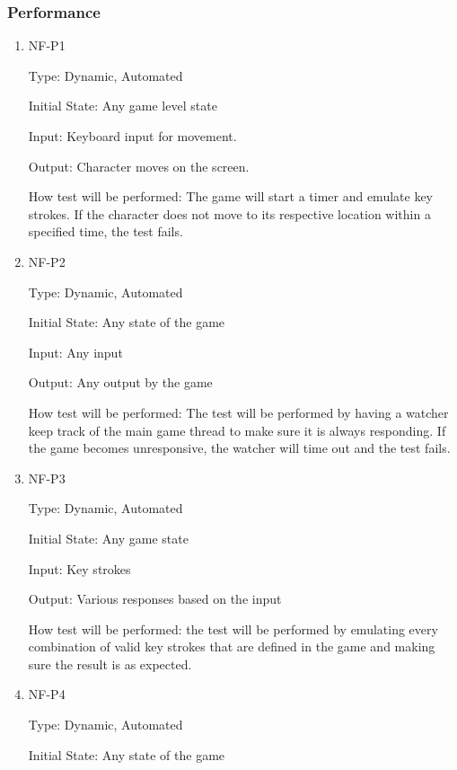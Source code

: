 \documentclass[12pt, titlepage]{article}
\begin{document}
\subsubsection{Performance}

\begin{enumerate}

\item{NF-P1\\}

Type:  Dynamic, Automated
					
Initial State: Any game level state
					
Input: Keyboard input for movement.
					
Output: Character moves on the screen.
					
How test will be performed: The game will start a timer and emulate key strokes. If the character does not move to its respective location within a specified time, the test fails.

\item{NF-P2\\}

Type: Dynamic, Automated
					
Initial State: Any state of the game
					
Input: Any input
					
Output: Any output by the game
					
How test will be performed: The test will be performed by having a watcher keep track of the main game thread to make sure it is always responding. If the game becomes unresponsive, the watcher will time out and the test fails.

\item{NF-P3\\}

Type: Dynamic, Automated
					
Initial State: Any game state
					
Input: Key strokes
					
Output: Various responses based on the input
					
How test will be performed: the test will be performed by emulating every combination of valid key strokes that are defined in the game and making sure the result is as expected.

\item{NF-P4\\}

Type: Dynamic, Automated        
					
Initial State: Any state of the game
					

\end{enumerate}
\end{document}
